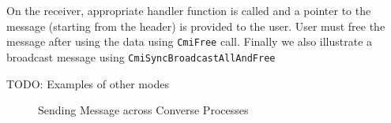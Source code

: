 \documentclass[10pt]{report}
\begin{document}
On the receiver, appropriate handler function is called and a pointer to the message (starting from the header) is provided to the user. User must free the message after using the data using \texttt{CmiFree} call. Finally we also illustrate a broadcast message using \texttt{CmiSyncBroadcastAllAndFree}

TODO: Examples of other modes

\begin{figure}

\caption{Sending Message across Converse Processes}
\label{fig:converse-pingpong}
\end{figure}
\end{document}
